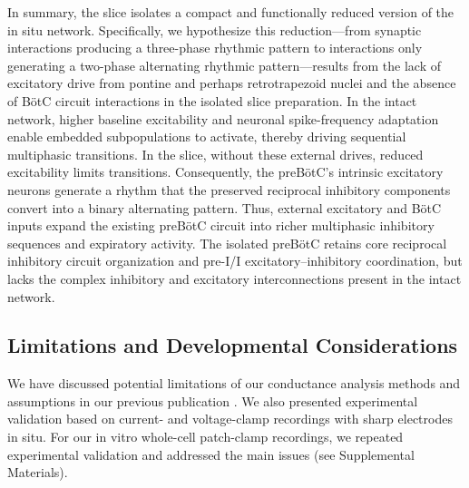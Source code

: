 \documentclass[
]{article}
\begin{document}
In summary, the slice isolates a compact and functionally reduced version of the in situ network. Specifically, we hypothesize this reduction---from synaptic interactions producing a three-phase rhythmic pattern to interactions only generating a two-phase alternating rhythmic pattern---results from the lack of excitatory drive from pontine and perhaps retrotrapezoid nuclei and the absence of BötC circuit interactions in the isolated slice preparation. In the intact network, higher baseline excitability and neuronal spike-frequency adaptation enable embedded subpopulations to activate, thereby driving sequential multiphasic transitions. In the slice, without these external drives, reduced excitability limits transitions. Consequently, the preBötC's intrinsic excitatory neurons generate a rhythm that the preserved reciprocal inhibitory components convert into a binary alternating pattern. Thus, external excitatory and BötC inputs expand the existing preBötC circuit into richer multiphasic inhibitory sequences and expiratory activity. The isolated preBötC retains core reciprocal inhibitory circuit organization and pre-I/I excitatory--inhibitory coordination, but lacks the complex inhibitory and excitatory interconnections present in the intact network.

\subsection{Limitations and Developmental Considerations}\label{limitations-and-developmental-considerations}

We have discussed potential limitations of our conductance analysis methods and assumptions in our previous publication \citep{molkov2024inference}. We also presented experimental validation based on current- and voltage-clamp recordings with sharp electrodes in situ. For our in vitro whole-cell patch-clamp recordings, we repeated experimental validation and addressed the main issues (see Supplemental Materials).
\end{document}
